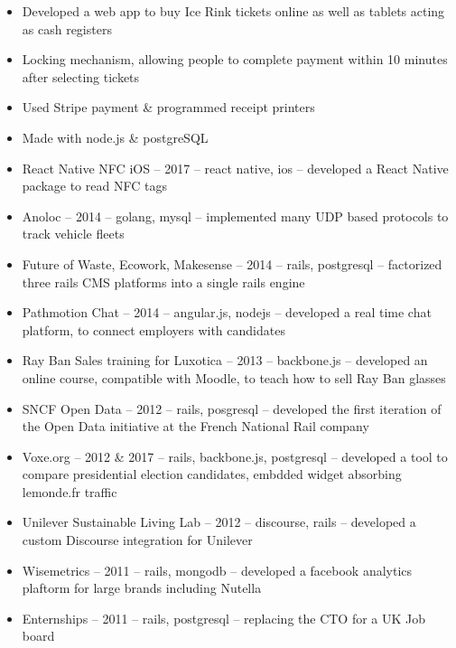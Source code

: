 \documentclass[10pt,a4paper,ragged2e,withhyper]{altacv}
\begin{document}
\begin{paracol}{2}
  \divider

  \begin{itemize}
    \item Developed a web app to buy Ice Rink tickets online as well as tablets acting as cash registers
    \item Locking mechanism, allowing people to complete payment within 10 minutes after selecting tickets
    \item Used Stripe payment \& programmed receipt printers
    \item Made with node.js \& postgreSQL
  \end{itemize}

  \divider

  \begin{itemize}
    \item React Native NFC iOS -- 2017 -- react native, ios -- developed a React Native package to read NFC tags
    \item Anoloc -- 2014 -- golang, mysql -- implemented many UDP based protocols to track vehicle fleets
    \item Future of Waste, Ecowork, Makesense -- 2014 -- rails, postgresql -- factorized three rails CMS platforms into a single rails engine
    \item Pathmotion Chat -- 2014 -- angular.js, nodejs -- developed a real time chat platform, to connect employers with candidates
    \item Ray Ban Sales training for Luxotica -- 2013 -- backbone.js -- developed an online course, compatible with Moodle, to teach how to sell Ray Ban glasses
    \item SNCF Open Data -- 2012 -- rails, posgresql -- developed the first iteration of the Open Data initiative at the French National Rail company
    \item Voxe.org -- 2012 \& 2017 -- rails, backbone.js, postgresql  -- developed a tool to compare presidential election candidates, embdded widget absorbing lemonde.fr traffic
    \item Unilever Sustainable Living Lab -- 2012 -- discourse, rails -- developed a custom Discourse integration for Unilever
    \item Wisemetrics -- 2011 -- rails, mongodb -- developed a facebook analytics plaftorm for large brands including Nutella
    \item Enternships -- 2011 -- rails, postgresql -- replacing the CTO for a UK Job board
  \end{itemize}



\end{paracol}
\end{document}
